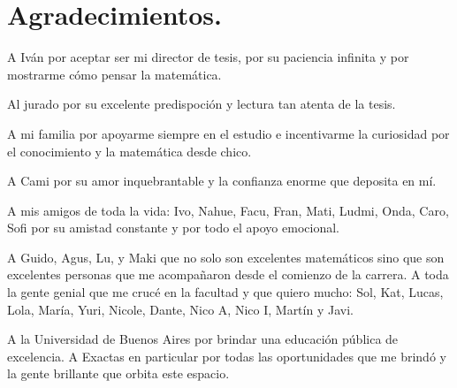\documentclass[tesis.tex]{subfiles}
\begin{document}
\chapter*{Agradecimientos.}

A Iván por aceptar ser mi director de tesis, por su paciencia infinita y por mostrarme cómo pensar la matemática.

Al jurado por su excelente predispoción y lectura tan atenta de la tesis.

A mi familia por apoyarme siempre en el estudio e incentivarme la curiosidad por el conocimiento y la matemática desde chico.

A Cami por su amor inquebrantable y la confianza enorme que deposita en mí. 

A mis amigos de toda la vida: Ivo, Nahue, Facu, Fran, Mati, Ludmi, Onda, Caro, Sofi por su amistad constante y por todo el apoyo emocional.

A Guido, Agus, Lu, y Maki que no solo son excelentes matemáticos sino que son excelentes personas que me acompañaron desde el comienzo de la carrera.
A toda la gente genial que me crucé en la facultad y que quiero mucho: Sol, Kat, Lucas, Lola, María, Yuri, Nicole, Dante, Nico A, Nico I, Martín y Javi.


A la Universidad de Buenos Aires por brindar una educación pública de excelencia. 
A Exactas en particular por todas las oportunidades que me brindó y la gente brillante que orbita este espacio.
\end{document}

